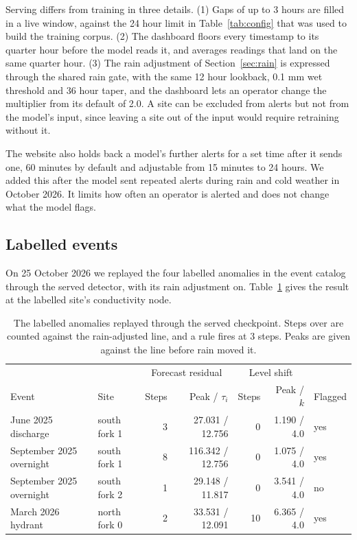 \documentclass{article}
\begin{document}
Serving differs from training in three details. (1) Gaps of up to 3 hours are
filled in a live window, against the 24 hour limit in Table~\ref{tab:config}
that was used to build the training corpus. (2) The dashboard floors every
timestamp to its quarter hour before the model reads it, and averages readings
that land on the same quarter hour. (3) The rain adjustment of
Section~\ref{sec:rain} is expressed through the shared rain gate, with the same
12 hour lookback, 0.1 mm wet threshold and 36 hour taper, and the dashboard lets
an operator change the multiplier from its default of 2.0. A site can be
excluded from alerts but not from the model's input, since leaving a site out
of the input would require retraining without it.

The website also holds back a model's further alerts for a set time after it
sends one, 60 minutes by default and adjustable from 15 minutes to 24 hours.
We added this after the model sent repeated alerts during rain and cold
weather in October 2026. It limits how often an operator is alerted and does
not change what the model flags.

\subsection{Labelled events}
\label{sec:events}

On 25 October 2026 we replayed the four labelled anomalies in the event
catalog through the served detector, with its rain adjustment on.
Table~\ref{tab:events} gives the result at the labelled site's conductivity
node.

\begin{table}[t]
  \centering
  \caption{The labelled anomalies replayed through the served checkpoint.
    Steps over are counted against the rain-adjusted line, and a rule fires at
    3 steps. Peaks are given against the line before rain moved it.}
  \label{tab:events}
  \begin{tabular}{llrrrrl}
    \toprule
     & & \multicolumn{2}{c}{Forecast residual} & \multicolumn{2}{c}{Level shift} & \\
    Event & Site & Steps & Peak / $\tau_i$ & Steps & Peak / $k$ & Flagged \\
    \midrule
    June 2025 discharge      & south fork 1 & 3 & 27.031 / 12.756  & 0  & 1.190 / 4.0 & yes \\
    September 2025 overnight & south fork 1 & 8 & 116.342 / 12.756 & 0  & 1.075 / 4.0 & yes \\
    September 2025 overnight & south fork 2 & 1 & 29.148 / 11.817  & 0  & 3.541 / 4.0 & no \\
    March 2026 hydrant       & north fork 0 & 2 & 33.531 / 12.091  & 10 & 6.365 / 4.0 & yes \\
    \bottomrule
  \end{tabular}
\end{table}
\end{document}
